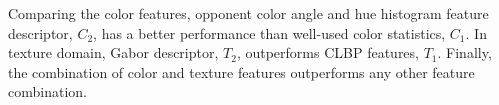 Comparing the color features, opponent color angle and hue histogram feature descriptor, $C_{2}$, has a better performance than well-used color statistics, $C_{1}$. 
In texture domain, Gabor descriptor, $T_{2}$, outperforms CLBP features, $T_{1}$.
Finally, the combination of color and texture features outperforms any other feature combination. 



